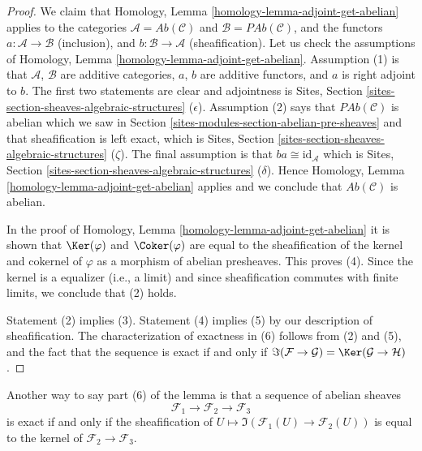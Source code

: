 \begin{proof}
We claim that Homology, Lemma \ref{homology-lemma-adjoint-get-abelian}
applies to the categories $\mathcal{A} = \textit{Ab}(\mathcal{C})$
and $\mathcal{B} = \textit{PAb}(\mathcal{C})$, and the functors
$a : \mathcal{A} \to \mathcal{B}$ (inclusion),  and
$b : \mathcal{B} \to \mathcal{A}$ (sheafification).
Let us check the assumptions of
Homology, Lemma \ref{homology-lemma-adjoint-get-abelian}.
Assumption (1) is that $\mathcal{A}$, $\mathcal{B}$ are additive categories,
$a$, $b$ are additive functors, and $a$ is right adjoint to $b$.
The first two statements are clear and adjointness is
Sites, Section \ref{sites-section-sheaves-algebraic-structures} ($\epsilon$).
Assumption (2) says that $\textit{PAb}(\mathcal{C})$ is abelian
which we saw in Section \ref{sites-modules-section-abelian-pre-sheaves} and
that sheafification is left exact, which is
Sites, Section \ref{sites-section-sheaves-algebraic-structures} ($\zeta$).
The final assumption is that $ba \cong \text{id}_\mathcal{A}$ which is
Sites, Section \ref{sites-section-sheaves-algebraic-structures} ($\delta$).
Hence Homology, Lemma \ref{homology-lemma-adjoint-get-abelian}
applies and we conclude that $\textit{Ab}(\mathcal{C})$ is abelian.

\medskip\noindent
In the proof of Homology, Lemma \ref{homology-lemma-adjoint-get-abelian}
it is shown that $\Ker(\varphi)$ and $\Coker(\varphi)$
are equal to the sheafification of the kernel and cokernel of $\varphi$
as a morphism of abelian presheaves. This proves (4). Since the kernel
is a equalizer (i.e., a limit) and since sheafification commutes with
finite limits, we conclude that (2) holds.

\medskip\noindent
Statement (2) implies (3). Statement (4) implies (5) by our description
of sheafification. The characterization of exactness in (6) follows from
(2) and (5), and the fact that the sequence is exact if and only if
$\Im(\mathcal{F} \to \mathcal{G}) =
\Ker(\mathcal{G} \to \mathcal{H})$.
\end{proof}

Another way to say part (6) of the lemma is that a
sequence of abelian sheaves
$$
\mathcal{F}_1 \longrightarrow
\mathcal{F}_2 \longrightarrow
\mathcal{F}_3
$$
is exact if and only if the sheafification of
$U \mapsto \Im(\mathcal{F}_1(U) \to \mathcal{F}_2(U))$
is equal to the kernel of $\mathcal{F}_2 \to \mathcal{F}_3$.

